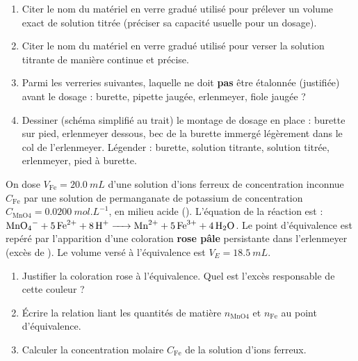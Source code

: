 \documentclass[11pt]{article}
\begin{document}
\begin{exercice}
\begin{enumerate}
    \item Citer le nom du matériel en verre gradué utilisé pour prélever un volume exact de solution titrée (préciser sa capacité usuelle pour un dosage).
    \item Citer le nom du matériel en verre gradué utilisé pour verser la solution titrante de manière continue et précise.
    \item Parmi les verreries suivantes, laquelle ne doit \textbf{pas} être étalonnée (justifiée) avant le dosage : burette, pipette jaugée, erlenmeyer, fiole jaugée ?
    \item Dessiner (schéma simplifié au trait) le montage de dosage en place : burette sur pied, erlenmeyer dessous, bec de la burette immergé légèrement dans le col de l'erlenmeyer. Légender : burette, solution titrante, solution titrée, erlenmeyer, pied à burette.
\end{enumerate}
\end{exercice}

\begin{exercice}
On dose $V_{\text{Fe}} = \SI{20,0}{mL}$ d'une solution d'ions ferreux  de concentration inconnue $C_{\text{Fe}}$ par une solution de permanganate de potassium  de concentration $C_{\text{MnO4}} = \SI{0,0200}{mol.L^{-1}}$, en milieu acide ().
L'équation de la réaction est : $\ce{MnO4^- + 5 Fe^{2+} + 8 H+ -> Mn^{2+} + 5 Fe^{3+} + 4 H2O}$.
Le point d'équivalence est repéré par l'apparition d'une coloration \textbf{rose pâle} persistante dans l'erlenmeyer (excès de ).
Le volume versé à l'équivalence est $V_E = \SI{18,5}{mL}$.
\begin{enumerate}
    \item Justifier la coloration rose à l'équivalence. Quel est l'excès responsable de cette couleur ?
    \item Écrire la relation liant les quantités de matière $n_{\text{MnO4}}$ et $n_{\text{Fe}}$ au point d'équivalence.
    \item Calculer la concentration molaire $C_{\text{Fe}}$ de la solution d'ions ferreux.
\end{enumerate}
\end{exercice}
\end{document}
